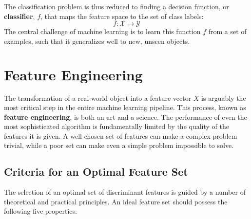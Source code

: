 The classification problem is thus reduced to finding a decision function, or \textbf{classifier}, $f$, that maps the feature space to the set of class labels:
$$ f: \mathcal{X} \to \mathcal{Y} $$
The central challenge of machine learning is to learn this function $f$ from a set of examples, such that it generalizes well to new, unseen objects.

\section{Feature Engineering}
\label{sec:feature_engineering}
The transformation of a real-world object into a feature vector $X$ is arguably the most critical step in the entire machine learning pipeline. This process, known as \textbf{feature engineering}, is both an art and a science. The performance of even the most sophisticated algorithm is fundamentally limited by the quality of the features it is given. A well-chosen set of features can make a complex problem trivial, while a poor set can make even a simple problem impossible to solve.

\subsection*{Criteria for an Optimal Feature Set}
The selection of an optimal set of discriminant features is guided by a number of theoretical and practical principles. An ideal feature set should possess the following five properties:

